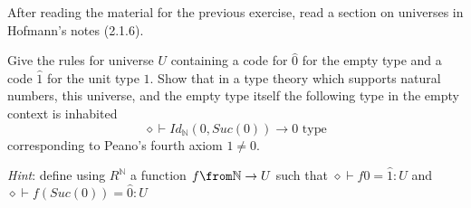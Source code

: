 \begin{exercise}
  After reading the material for the previous exercise, read a section on
  universes in Hofmann's notes (2.1.6).

  Give the rules for universe $U$ containing a code for $\hat{0}$ for the empty
  type and a code $\hat{1}$ for the unit type $1$. Show that in a type theory
  which supports natural numbers, this universe, and the empty type itself the
  following type in the empty context is inhabited
  \[
    \diamond \vdash Id_\mathbb{N}(0, Suc(0)) \to 0 \text{ type}
  \]
  corresponding to Peano's fourth axiom $1 \neq 0$.

  \emph{Hint}: define using $R^\mathbb{N}$ a function $f \from \mathbb{N} \to
  U$ such that $\diamond \vdash f 0 = \hat{1}: U$ and $\diamond \vdash
  f(Suc(0)) = \hat{0} : U$
\end{exercise}



